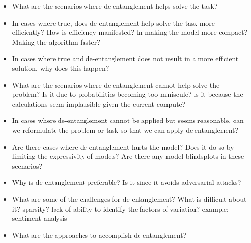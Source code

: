 \begin{itemize}
    \item What are the scenarios where de-entanglement helps solve the task?
    \item In cases where true, does de-entanglement help solve the task more efficiently? How is efficiency manifested? In making the model more compact? Making the algorithm faster?
    \item In cases where true and de-entanglement does not result in a more efficient solution, why does this happen? 
    \item What are the scenarios where de-entanglement cannot help solve the problem? Is it due to probabilities becoming too miniscule? Is it because the calculations seem implausible given the current compute? 
    \item In cases where de-entanglement cannot be applied but seems reasonable, can we reformulate the problem or task so that we can apply de-entanglement? 
    \item Are there cases where de-entanglement hurts the model? Does it do so by limiting the expressivity of models? Are there any model blindsplots in these scenarios? 
    \item Why is de-entanglement preferable? Is it since it avoids adversarial attacks?
    \item What are some of the challenges for de-entanglement? What is difficult about it? sparsity? lack of ability to identify the factors of variation? example: sentiment analysis
    \item What are the approaches to accomplish de-entanglement? 
    
\end{itemize}



